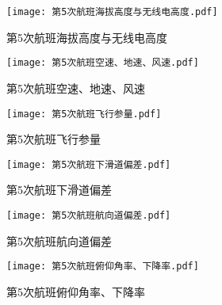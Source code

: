 \documentclass{MathorCupModeling}
\begin{document}
	\begin{figure}[H]
		\centering
		\begin{minipage}{0.48\linewidth}
			\centering
			\texttt{[image: 第5次航班海拔高度与无线电高度.pdf]}
			\caption{第5次航班海拔高度与无线电高度}
			\label{fig:第5次航班海拔高度与无线电高度}
		\end{minipage}
		\begin{minipage}{0.48\linewidth}
			\centering
			\texttt{[image: 第5次航班空速、地速、风速.pdf]}
			\caption{第5次航班空速、地速、风速}
			\label{fig:第5次航班空速、地速、风速}
		\end{minipage}
	\end{figure}
	\begin{figure}[H]
		\centering
		\begin{minipage}{0.48\linewidth}
			\centering
			\texttt{[image: 第5次航班飞行参量.pdf]}
			\caption{第5次航班飞行参量}
			\label{fig:第5次航班飞行参量}
		\end{minipage}
		\begin{minipage}{0.48\linewidth}
			\centering
			\texttt{[image: 第5次航班下滑道偏差.pdf]}
			\caption{第5次航班下滑道偏差}
			\label{fig:第5次航班下滑道偏差}
		\end{minipage}
	\end{figure}
	\begin{figure}[H]
		\centering
		\begin{minipage}{0.48\linewidth}
			\centering
			\texttt{[image: 第5次航班航向道偏差.pdf]}
			\caption{第5次航班航向道偏差}
			\label{fig:第5次航班航向道偏差}
		\end{minipage}
		\begin{minipage}{0.48\linewidth}
			\centering
			\texttt{[image: 第5次航班俯仰角率、下降率.pdf]}
			\caption{第5次航班俯仰角率、下降率}
			\label{fig:第5次航班俯仰角率、下降率}
		\end{minipage}
	\end{figure}
\end{document}
